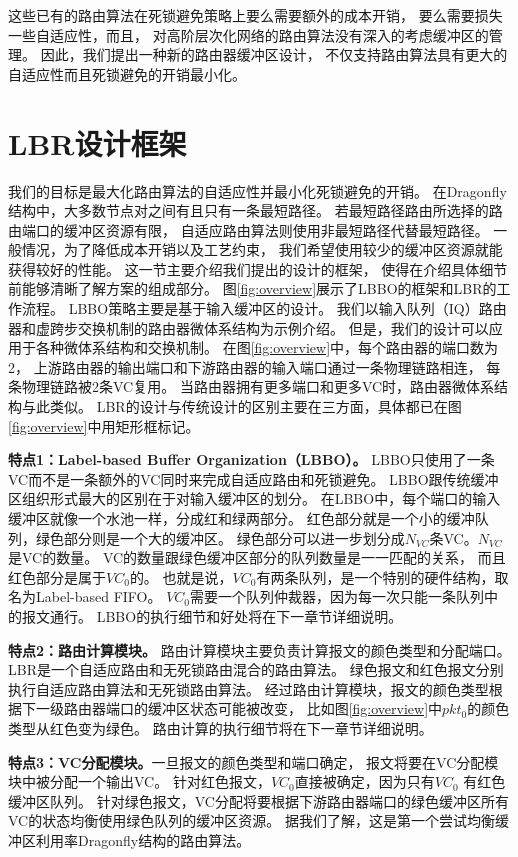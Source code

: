 这些已有的路由算法在死锁避免策略上要么需要额外的成本开销，
要么需要损失一些自适应性，而且，
对高阶层次化网络的路由算法没有深入的考虑缓冲区的管理。
因此，我们提出一种新的路由器缓冲区设计，
不仅支持路由算法具有更大的自适应性而且死锁避免的开销最小化。

\section{LBR设计框架}

我们的目标是最大化路由算法的自适应性并最小化死锁避免的开销。
在Dragonfly 结构中，大多数节点对之间有且只有一条最短路径。
若最短路径路由所选择的路由端口的缓冲区资源有限，
自适应路由算法则使用非最短路径代替最短路径。
一般情况，为了降低成本开销以及工艺约束，
我们希望使用较少的缓冲区资源就能获得较好的性能。
这一节主要介绍我们提出的设计的框架，
使得在介绍具体细节前能够清晰了解方案的组成部分。
图\ref{fig:overview}展示了LBBO的框架和LBR的工作流程。
LBBO策略主要是基于输入缓冲区的设计。
我们以输入队列（IQ）路由器和虚跨步交换机制的路由器微体系结构为示例介绍。
但是，我们的设计可以应用于各种微体系结构和交换机制。
在图\ref{fig:overview}中，每个路由器的端口数为2，
上游路由器的输出端口和下游路由器的输入端口通过一条物理链路相连，
每条物理链路被2条VC复用。
当路由器拥有更多端口和更多VC时，路由器微体系结构与此类似。
LBR的设计与传统设计的区别主要在三方面，具体都已在图\ref{fig:overview}中用矩形框标记。

\textbf{特点1：Label-based Buffer Organization（LBBO）。}
LBBO只使用了一条VC而不是一条额外的VC同时来完成自适应路由和死锁避免。
LBBO跟传统缓冲区组织形式最大的区别在于对输入缓冲区的划分。
在LBBO中，每个端口的输入缓冲区就像一个水池一样，分成红和绿两部分。
红色部分就是一个小的缓冲队列，绿色部分则是一个大的缓冲区。
绿色部分可以进一步划分成$N_{VC}$条VC。$N_{VC}$是VC的数量。
VC的数量跟绿色缓冲区部分的队列数量是一一匹配的关系，
而且红色部分是属于$VC_0$的。
也就是说，$VC_0$有两条队列，是一个特别的硬件结构，取名为Label-based FIFO。
$VC_0$需要一个队列仲裁器，因为每一次只能一条队列中的报文通行。
LBBO的执行细节和好处将在下一章节详细说明。

\textbf{特点2：路由计算模块。}
路由计算模块主要负责计算报文的颜色类型和分配端口。
LBR是一个自适应路由和无死锁路由混合的路由算法。
绿色报文和红色报文分别执行自适应路由算法和无死锁路由算法。
经过路由计算模块，报文的颜色类型根据下一级路由器端口的缓冲区状态可能被改变，
比如图\ref{fig:overview}中$pkt_0$的颜色类型从红色变为绿色。
路由计算的执行细节将在下一章节详细说明。

\textbf{特点3：VC分配模块。}一旦报文的颜色类型和端口确定，
报文将要在VC分配模块中被分配一个输出VC。
针对红色报文，$VC_0$直接被确定，因为只有$VC_0$ 有红色缓冲区队列。
针对绿色报文，VC分配将要根据下游路由器端口的绿色缓冲区所有VC的状态均衡使用绿色队列的缓冲区资源。
据我们了解，这是第一个尝试均衡缓冲区利用率Dragonfly结构的路由算法。

